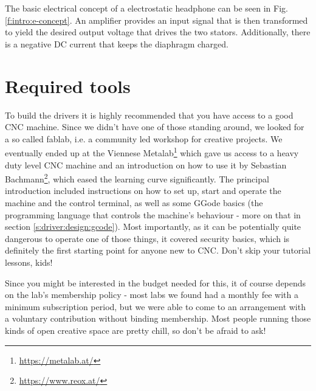 \documentclass{article}
\begin{document}
The basic electrical concept of a electrostatic headphone can be seen in Fig. \ref{f:intro:e-concept}. An amplifier provides an input signal that is then transformed to yield the desired output voltage that drives the two stators. Additionally, there is a negative DC current that keeps the diaphragm charged.

\section{Required tools}
\label{s:tools}

To build the drivers it is highly recommended that you have access to a good CNC machine. Since we didn't have one of those standing around, we looked for a so called fablab, i.e. a community led workshop for creative projects. We eventually ended up at the Viennese Metalab\footnote{\url{https://metalab.at/}} which gave us access to a heavy duty level CNC machine and an introduction on how to use it by Sebastian Bachmann\footnote{\url{https://www.reox.at/}}, which eased the learning curve significantly. The principal introduction included instructions on how to set up, start and operate the machine and the control terminal, as well as some GGode basics (the programming language that controls the machine's behaviour - more on that in section \ref{s:driver:design:gcode}). Most importantly, as it can be potentially quite dangerous to operate one of those things, it covered security basics, which is definitely the first starting point for anyone new to CNC. Don't skip your tutorial lessons, kids!

Since you might be interested in the budget needed for this, it of course depends on the lab's membership policy - most labs we found had a monthly fee with a minimum subscription period, but we were able to come to an arrangement with a voluntary contribution without binding membership. Most people running those kinds of open creative space are pretty chill, so don't be afraid to ask!
\end{document}
